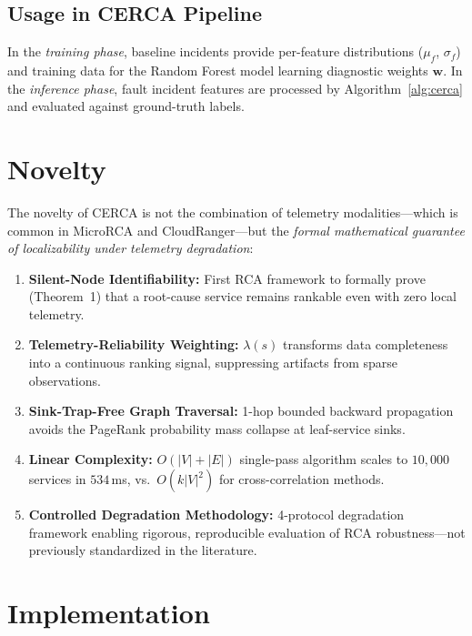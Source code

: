 \documentclass[conference]{IEEEtran}
\begin{document}
\subsection{Usage in CERCA Pipeline}

In the \textit{training phase}, baseline incidents provide per-feature distributions ($\mu_f$, $\sigma_f$) and training data for the Random Forest model learning diagnostic weights $\mathbf{w}$. In the \textit{inference phase}, fault incident features are processed by Algorithm~\ref{alg:cerca} and evaluated against ground-truth labels.

\section{Novelty}

The novelty of CERCA is not the combination of telemetry modalities---which is common in MicroRCA and CloudRanger---but the \textit{formal mathematical guarantee of localizability under telemetry degradation}:

\begin{enumerate}
    \item \textbf{Silent-Node Identifiability:} First RCA framework to formally prove (Theorem~1) that a root-cause service remains rankable even with zero local telemetry.
    \item \textbf{Telemetry-Reliability Weighting:} $\lambda(s)$ transforms data completeness into a continuous ranking signal, suppressing artifacts from sparse observations.
    \item \textbf{Sink-Trap-Free Graph Traversal:} 1-hop bounded backward propagation avoids the PageRank probability mass collapse at leaf-service sinks.
    \item \textbf{Linear Complexity:} $O(|V|+|E|)$ single-pass algorithm scales to $10{,}000$ services in $534$\,ms, vs.\ $O(k|V|^2)$ for cross-correlation methods.
    \item \textbf{Controlled Degradation Methodology:} 4-protocol degradation framework enabling rigorous, reproducible evaluation of RCA robustness---not previously standardized in the literature.
\end{enumerate}

\section{Implementation}
\end{document}
